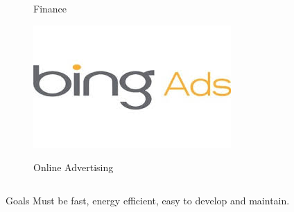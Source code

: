 \begin{frame}
\begin{columns}
\begin{center}
\begin{figure}
        \caption{Finance}
      \end{figure}
            \vspace{-0.5cm}
      \begin{figure}
        \includegraphics[scale=0.31]{figs/ads.jpg}\\
        \caption{Online Advertising}
      \end{figure}
    \end{center}
  \end{columns}
  \vspace{0.5cm}
  \begin{beamerboxesrounded}{Goals}
    Must be fast, energy efficient, easy to develop and maintain.
  \end{beamerboxesrounded}
\end{frame}

